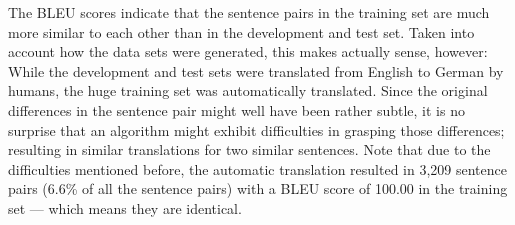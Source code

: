













The BLEU scores indicate that the sentence pairs in the training set are much
more similar to each other than in the development and test set. Taken into account how
the data sets were generated, this makes actually sense, however: While the development
and test sets were translated from English to German by humans, the huge training set was
automatically translated. Since the original differences in the sentence pair might well
have been rather subtle, it is no surprise that an algorithm might exhibit difficulties in
grasping those differences; resulting in similar translations for two similar sentences.
Note that due to the difficulties mentioned before, the automatic translation resulted in
3,209 sentence pairs (6.6\% of all the sentence pairs) with a BLEU score of 100.00 in the
training set --- which means they are identical.



